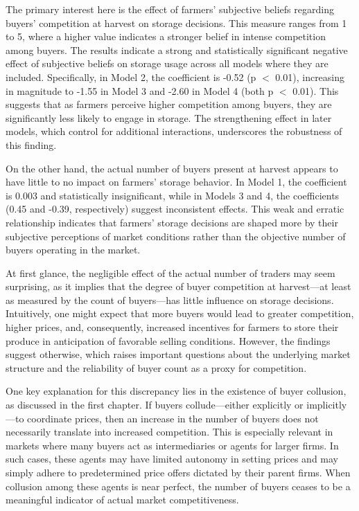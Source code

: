\documentclass[12pt]{article}
\begin{document}


The primary interest here is the effect of farmers' subjective beliefs regarding buyers' competition at harvest on storage decisions. This measure ranges from 1 to 5, where a higher value indicates a stronger belief in intense competition among buyers. The results indicate a strong and statistically significant negative effect of subjective beliefs on storage usage across all models where they are included. Specifically, in Model 2, the coefficient is -0.52 (p $<$ 0.01), increasing in magnitude to -1.55 in Model 3 and -2.60 in Model 4 (both p $<$ 0.01). This suggests that as farmers perceive higher competition among buyers, they are significantly less likely to engage in storage. The strengthening effect in later models, which control for additional interactions, underscores the robustness of this finding.

On the other hand, the actual number of buyers present at harvest appears to have little to no impact on farmers' storage behavior. In Model 1, the coefficient is 0.003 and statistically insignificant, while in Models 3 and 4, the coefficients (0.45 and -0.39, respectively) suggest inconsistent effects. This weak and erratic relationship indicates that farmers’ storage decisions are shaped more by their subjective perceptions of market conditions rather than the objective number of buyers operating in the market.

At first glance, the negligible effect of the actual number of traders may seem surprising, as it implies that the degree of buyer competition at harvest—at least as measured by the count of buyers—has little influence on storage decisions. Intuitively, one might expect that more buyers would lead to greater competition, higher prices, and, consequently, increased incentives for farmers to store their produce in anticipation of favorable selling conditions. However, the findings suggest otherwise, which raises important questions about the underlying market structure and the reliability of buyer count as a proxy for competition.

One key explanation for this discrepancy lies in the existence of buyer collusion, as discussed in the first chapter. If buyers collude—either explicitly or implicitly—to coordinate prices, then an increase in the number of buyers does not necessarily translate into increased competition. This is especially relevant in markets where many buyers act as intermediaries or agents for larger firms. In such cases, these agents may have limited autonomy in setting prices and may simply adhere to predetermined price offers dictated by their parent firms. When collusion among these agents is near perfect, the number of buyers ceases to be a meaningful indicator of actual market competitiveness.
\end{document}
